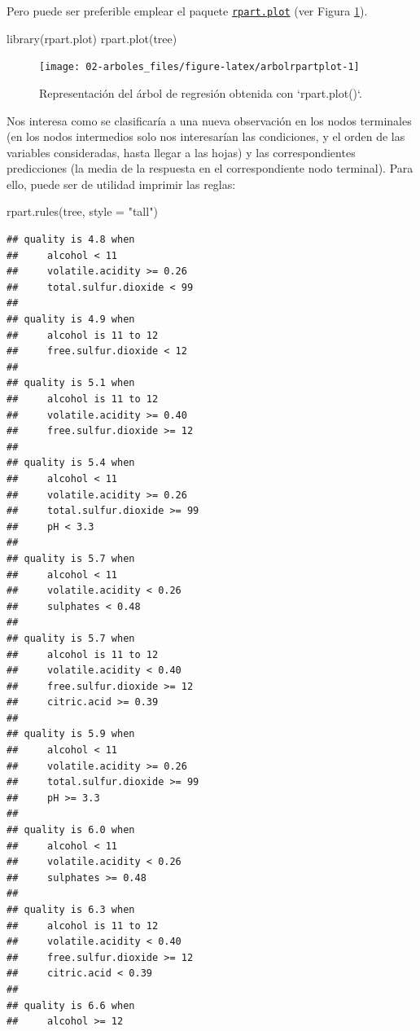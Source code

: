 \documentclass[
  spanish,
]{book}
\newenvironment{Shaded}{\begin{snugshade}}{\end{snugshade}}
\newcommand{\AttributeTok}[1]{\textcolor[rgb]{0.77,0.63,0.00}{#1}}
\newcommand{\FunctionTok}[1]{\textcolor[rgb]{0.00,0.00,0.00}{#1}}
\newcommand{\NormalTok}[1]{#1}
\newcommand{\StringTok}[1]{\textcolor[rgb]{0.31,0.60,0.02}{#1}}
\theoremstyle{break}
\theoremstyle{definition}
\theoremstyle{definition}
\theoremstyle{definition}
\theoremstyle{definition}
\theoremstyle{remark}
\begin{document}
Pero puede ser preferible emplear el paquete \href{https://CRAN.R-project.org/package=rpart.plot}{\texttt{rpart.plot}} (ver Figura \ref{fig:arbolrpartplot}).

\begin{Shaded}
\begin{Highlighting}[]
\FunctionTok{library}\NormalTok{(rpart.plot)}
\FunctionTok{rpart.plot}\NormalTok{(tree)  }
\end{Highlighting}
\end{Shaded}

\begin{figure}[!htb]

{\centering \texttt{[image: 02-arboles\_files/figure-latex/arbolrpartplot-1]} 

}

\caption{Representación del árbol de regresión obtenida con `rpart.plot()`.}\label{fig:arbolrpartplot}
\end{figure}

Nos interesa como se clasificaría a una nueva observación en los nodos terminales (en los nodos intermedios solo nos interesarían las condiciones, y el orden de las variables consideradas, hasta llegar a las hojas) y las correspondientes predicciones (la media de la respuesta en el correspondiente nodo terminal).
Para ello, puede ser de utilidad imprimir las reglas:

\begin{Shaded}
\begin{Highlighting}[]
\FunctionTok{rpart.rules}\NormalTok{(tree, }\AttributeTok{style =} \StringTok{"tall"}\NormalTok{)}
\end{Highlighting}
\end{Shaded}

\begin{verbatim}
## quality is 4.8 when
##     alcohol < 11
##     volatile.acidity >= 0.26
##     total.sulfur.dioxide < 99
## 
## quality is 4.9 when
##     alcohol is 11 to 12
##     free.sulfur.dioxide < 12
## 
## quality is 5.1 when
##     alcohol is 11 to 12
##     volatile.acidity >= 0.40
##     free.sulfur.dioxide >= 12
## 
## quality is 5.4 when
##     alcohol < 11
##     volatile.acidity >= 0.26
##     total.sulfur.dioxide >= 99
##     pH < 3.3
## 
## quality is 5.7 when
##     alcohol < 11
##     volatile.acidity < 0.26
##     sulphates < 0.48
## 
## quality is 5.7 when
##     alcohol is 11 to 12
##     volatile.acidity < 0.40
##     free.sulfur.dioxide >= 12
##     citric.acid >= 0.39
## 
## quality is 5.9 when
##     alcohol < 11
##     volatile.acidity >= 0.26
##     total.sulfur.dioxide >= 99
##     pH >= 3.3
## 
## quality is 6.0 when
##     alcohol < 11
##     volatile.acidity < 0.26
##     sulphates >= 0.48
## 
## quality is 6.3 when
##     alcohol is 11 to 12
##     volatile.acidity < 0.40
##     free.sulfur.dioxide >= 12
##     citric.acid < 0.39
## 
## quality is 6.6 when
##     alcohol >= 12
\end{verbatim}
\end{document}
